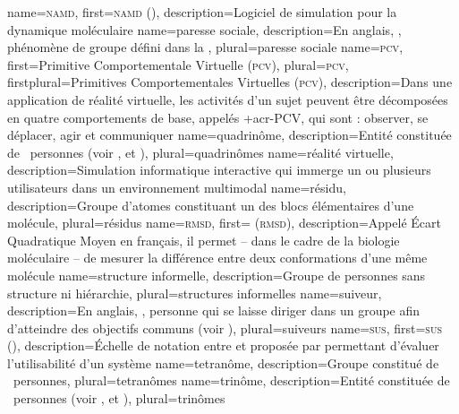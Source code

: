 %
{%
	name={\textsc{namd}},%
	first={\textsc{namd} ()},%
	description={Logiciel de simulation pour la dynamique moléculaire }%
}
%
{%
	name={paresse sociale},%
	description={En anglais, , phénomène de groupe défini dans la },
	plural={paresse sociale}%
}
%
{%
	name={\textsc{pcv}},
	first={Primitive Comportementale Virtuelle (\textsc{pcv})},%
	plural={\textsc{pcv}},
	firstplural={Primitives Comportementales Virtuelles (\textsc{pcv})},%
	description={Dans une application de réalité virtuelle, les activités d'un sujet peuvent être décomposées en quatre comportements de base, appelés \myacro+{acr-PCV}, qui sont : observer, se déplacer, agir et communiquer }
}
%
{%
	name={quadrinôme},%
	description={Entité constituée de ~personnes (voir ,  et )},%
	plural={quadrinômes}%
}
%
{%
	name={réalité virtuelle},%
	description={Simulation informatique interactive qui immerge un ou plusieurs utilisateurs dans un environnement multimodal}%
}
%
{%
	name={résidu},%
	description={Groupe d'atomes constituant un des blocs élémentaires d'une molécule},%
	plural={résidus}%
}
%
{%
	name={\textsc{rmsd}},%
	first={ (\textsc{rmsd})},%
	description={Appelé Écart Quadratique Moyen en français, il permet -- dans le cadre de la biologie moléculaire -- de mesurer la différence entre deux conformations d'une même molécule}%
}
%
{%
	name={structure informelle},%
	description={Groupe de personnes sans structure ni hiérarchie},%
	plural={structures informelles}%
}
%
{%
	name={suiveur},%
	description={En anglais, , personne qui se laisse diriger dans un groupe afin d'atteindre des objectifs communs (voir )},%
	plural={suiveurs}%
}
%
{%
	name={\textsc{sus}},%
	first={\textsc{sus} ()},%
	description={Échelle de notation entre  et  proposée par  permettant d'évaluer l'utilisabilité d'un système}%
}
%
{%
	name={tetranôme},%
	description={Groupe constitué de ~personnes},%
	plural={tetranômes}%
}
%
{%
	name={trinôme},%
	description={Entité constituée de ~personnes (voir ,  et )},%
	plural={trinômes}%
}
